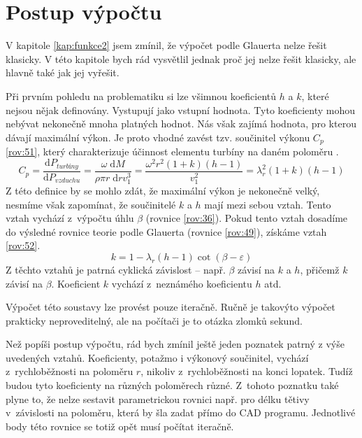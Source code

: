 	\section{Postup výpočtu}\label{postup}
	V kapitole \ref{kap:funkce2} jsem zmínil, že výpočet podle Glauerta nelze řešit klasicky. V této kapitole bych rád vysvětlil jednak proč jej nelze řešit klasicky, ale hlavně také jak jej vyřešit.
	
	Při prvním pohledu na problematiku si lze všimnou koeficientů $h$ a $k$, které nejsou nějak definovány. Vystupují jako vstupní hodnota. Tyto koeficienty mohou nebývat nekonečně mnoha platných hodnot. Nás však zajímá hodnota, pro kterou dávají maximální výkon. Je proto vhodné zavést tzv. součinitel výkonu $C_p$ \eqref{rov:51}, který charakterizuje účinnost elementu turbíny na daném poloměru \cite{Rychetnik:Motory}.
	\begin{equation}
		\label{rov:51}
		C_p=\frac{\mathrm{d}P_{turbíny}}{\mathrm{d}P_{vzduchu}}=\frac{\omega\;\mathrm{d}M}{\rho\pi r \; \mathrm{d}rv_1^3}=\frac{\omega^2r^2(1+k)(h-1)}{v_1^2}=\lambda_r^2(1+k)(h-1)
	\end{equation}
	Z této definice by se mohlo zdát, že maximální výkon je nekonečně velký, nesmíme však zapomínat, že součinitelé $k$ a $h$ mají mezi sebou vztah. Tento vztah vychází z~výpočtu úhlu $\beta$ (rovnice \eqref{rov:36}). Pokud tento vztah dosadíme do výsledné rovnice teorie podle Glauerta (rovnice \eqref{rov:49}), získáme vztah \eqref{rov:52}.
		\begin{equation}
			\label{rov:52}
			k= 1 - \lambda_r(h-1)\cot(\beta-\varepsilon)
		\end{equation}
	Z těchto vztahů je patrná cyklická závislost – např. $\beta$ závisí na $k$ a $h$, přičemž $k$ závisí na $\beta$. Koeficient $k$ vychází z~neznámého koeficientu $h$ atd.
	
	Výpočet této soustavy lze provést pouze iteračně. Ručně je takovýto výpočet prakticky neproveditelný, ale na počítači je to otázka zlomků sekund.
	
	Než popíši postup výpočtu, rád bych zmínil ještě jeden poznatek patrný z výše uvedených vztahů. Koeficienty, potažmo i výkonový součinitel, vychází z~rychloběžnosti na poloměru $r$, nikoliv z~rychloběžnosti na konci lopatek. Tudíž budou tyto koeficienty na různých poloměrech různé. Z~tohoto poznatku také plyne to, že nelze sestavit parametrickou rovnici např. pro délku tětivy v~závislosti na poloměru, která by šla zadat přímo do CAD programu. Jednotlivé body této rovnice se totiž opět musí počítat iteračně.
	

